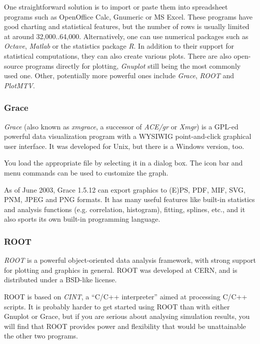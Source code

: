 One straightforward solution is to import or paste them into spreadsheet
programs such as OpenOffice Calc, Gnumeric or MS Excel. These programs
have good charting and statistical features, but the number of rows
is usually limited at around 32,000..64,000.
Alternatively, one can use numerical packages such as \textit{Octave},
\textit{Matlab} or the statistics package \textit{R}.
In addition to their support for statistical computations, they can also
create various plots.
There are also open-source programs directly for plotting, \textit{Gnuplot}
still being the most commonly used one. Other, potentially more powerful ones
include \textit{Grace}, \textit{ROOT} and \textit{PlotMTV}.


\subsubsection{Grace}

\textit{Grace} (also known as \textit{xmgrace}, a successor of \textit{ACE/gr} or
\textit{Xmgr}) is a GPL-ed powerful data visualization program
with a WYSIWIG point-and-click graphical user interface. It was developed for
Unix, but there is a Windows version, too.

You load the appropriate file by selecting it in a dialog box.
The icon bar and menu commands can be used to customize the graph.

As of June 2003, Grace 1.5.12 can export graphics to (E)PS, PDF, MIF, SVG,
PNM, JPEG and PNG formats. It has many useful features like built-in statistics
and analysis functions (e.g. correlation, histogram), fitting, splines, etc.,
and it also sports its own built-in programming language.


\subsubsection{ROOT}

\textit{ROOT} is a powerful object-oriented data analysis framework,
with strong support for plotting and graphics in general.
ROOT was developed at CERN, and is distributed under a BSD-like license.

ROOT is based on \textit{CINT}, a ``C/C++ interpreter''
aimed at processing C/C++ scripts. It is probably harder to get started
using ROOT than with either Gnuplot or Grace, but if you are serious
about analysing simulation results, you will find that ROOT provides
power and flexibility that would be unattainable the other two programs.

